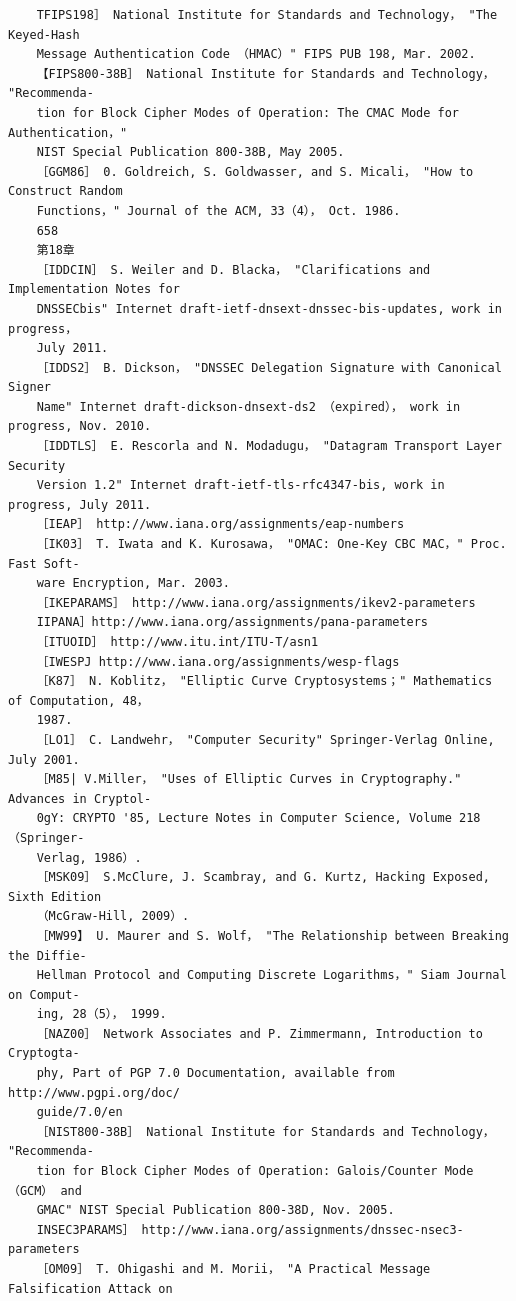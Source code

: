 \begin{verbatim}
    TFIPS198］ National Institute for Standards and Technology， "The Keyed-Hash
    Message Authentication Code （HMAC）" FIPS PUB 198, Mar. 2002.
    【FIPS800-38B］ National Institute for Standards and Technology， "Recommenda-
    tion for Block Cipher Modes of Operation: The CMAC Mode for Authentication，"
    NIST Special Publication 800-38B, May 2005.
    ［GGM86］ 0. Goldreich, S. Goldwasser, and S. Micali， "How to Construct Random
    Functions，" Journal of the ACM, 33（4）， Oct. 1986.
    658
    第18章
    ［IDDCIN］ S. Weiler and D. Blacka， "Clarifications and Implementation Notes for
    DNSSECbis" Internet draft-ietf-dnsext-dnssec-bis-updates, work in progress，
    July 2011.
    ［IDDS2］ B. Dickson， "DNSSEC Delegation Signature with Canonical Signer
    Name" Internet draft-dickson-dnsext-ds2 （expired）， work in progress, Nov. 2010.
    ［IDDTLS］ E. Rescorla and N. Modadugu， "Datagram Transport Layer Security
    Version 1.2" Internet draft-ietf-tls-rfc4347-bis, work in progress, July 2011.
    ［IEAP］ http://www.iana.org/assignments/eap-numbers
    ［IK03］ T. Iwata and K. Kurosawa， "OMAC: One-Key CBC MAC，" Proc. Fast Soft-
    ware Encryption, Mar. 2003.
    ［IKEPARAMS］ http://www.iana.org/assignments/ikev2-parameters
    IIPANA］http://www.iana.org/assignments/pana-parameters
    ［ITUOID］ http://www.itu.int/ITU-T/asn1
    ［IWESPJ http://www.iana.org/assignments/wesp-flags
    ［K87］ N. Koblitz， "Elliptic Curve Cryptosystems；" Mathematics of Computation, 48，
    1987.
    ［LO1］ C. Landwehr， "Computer Security" Springer-Verlag Online, July 2001.
    ［M85| V.Miller， "Uses of Elliptic Curves in Cryptography." Advances in Cryptol-
    0gY: CRYPTO '85, Lecture Notes in Computer Science, Volume 218 （Springer-
    Verlag, 1986）.
    ［MSK09］ S.McClure, J. Scambray, and G. Kurtz, Hacking Exposed, Sixth Edition
    （McGraw-Hill, 2009）.
    ［MW99】 U. Maurer and S. Wolf， "The Relationship between Breaking the Diffie-
    Hellman Protocol and Computing Discrete Logarithms，" Siam Journal on Comput-
    ing, 28（5）， 1999.
    ［NAZ00］ Network Associates and P. Zimmermann, Introduction to Cryptogta-
    phy, Part of PGP 7.0 Documentation, available from http://www.pgpi.org/doc/
    guide/7.0/en
    ［NIST800-38B］ National Institute for Standards and Technology， "Recommenda-
    tion for Block Cipher Modes of Operation: Galois/Counter Mode （GCM） and
    GMAC" NIST Special Publication 800-38D, Nov. 2005.
    INSEC3PARAMS］ http://www.iana.org/assignments/dnssec-nsec3-parameters
    ［OM09］ T. Ohigashi and M. Morii， "A Practical Message Falsification Attack on

\end{verbatim}
